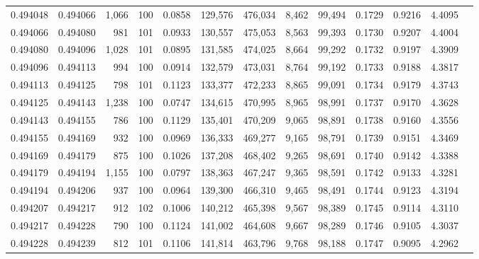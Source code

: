 \begin{tabular}{rrrrrrrrrrrrr}
0.494048 & 0.494066 & 1,066 & 100 &                                     0.0858 & 129,576 & 476,034 &   8,462 &  99,494 & 0.1729 & 0.9216 & 4.4095 \\
0.494066 & 0.494080 &   981 & 101 &                                     0.0933 & 130,557 & 475,053 &   8,563 &  99,393 & 0.1730 & 0.9207 & 4.4004 \\
0.494080 & 0.494096 & 1,028 & 101 &                                     0.0895 & 131,585 & 474,025 &   8,664 &  99,292 & 0.1732 & 0.9197 & 4.3909 \\
0.494096 & 0.494113 &   994 & 100 &                                     0.0914 & 132,579 & 473,031 &   8,764 &  99,192 & 0.1733 & 0.9188 & 4.3817 \\
0.494113 & 0.494125 &   798 & 101 &                                     0.1123 & 133,377 & 472,233 &   8,865 &  99,091 & 0.1734 & 0.9179 & 4.3743 \\
0.494125 & 0.494143 & 1,238 & 100 &                                     0.0747 & 134,615 & 470,995 &   8,965 &  98,991 & 0.1737 & 0.9170 & 4.3628 \\
0.494143 & 0.494155 &   786 & 100 &                                     0.1129 & 135,401 & 470,209 &   9,065 &  98,891 & 0.1738 & 0.9160 & 4.3556 \\
0.494155 & 0.494169 &   932 & 100 &                                     0.0969 & 136,333 & 469,277 &   9,165 &  98,791 & 0.1739 & 0.9151 & 4.3469 \\
0.494169 & 0.494179 &   875 & 100 &                                     0.1026 & 137,208 & 468,402 &   9,265 &  98,691 & 0.1740 & 0.9142 & 4.3388 \\
0.494179 & 0.494194 & 1,155 & 100 &                                     0.0797 & 138,363 & 467,247 &   9,365 &  98,591 & 0.1742 & 0.9133 & 4.3281 \\
0.494194 & 0.494206 &   937 & 100 &                                     0.0964 & 139,300 & 466,310 &   9,465 &  98,491 & 0.1744 & 0.9123 & 4.3194 \\
0.494207 & 0.494217 &   912 & 102 &                                     0.1006 & 140,212 & 465,398 &   9,567 &  98,389 & 0.1745 & 0.9114 & 4.3110 \\
0.494217 & 0.494228 &   790 & 100 &                                     0.1124 & 141,002 & 464,608 &   9,667 &  98,289 & 0.1746 & 0.9105 & 4.3037 \\
0.494228 & 0.494239 &   812 & 101 &                                     0.1106 & 141,814 & 463,796 &   9,768 &  98,188 & 0.1747 & 0.9095 & 4.2962 \\

\end{tabular}
